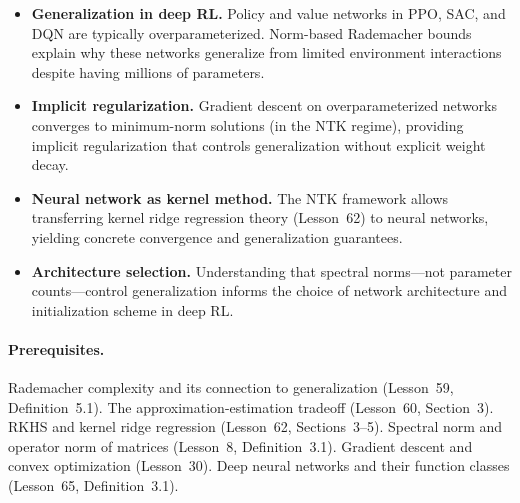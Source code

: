 \documentclass[11pt,a4paper]{article}
\begin{document}
\begin{rlconnection}[title={Why NTK and Rademacher Complexity Matter
    for RL/ML}]
\begin{itemize}[nosep]
  \item \textbf{Generalization in deep RL.}  Policy and value networks
    in PPO, SAC, and DQN are typically overparameterized.  Norm-based
    Rademacher bounds explain why these networks generalize from
    limited environment interactions despite having millions of
    parameters.
  \item \textbf{Implicit regularization.}  Gradient descent on
    overparameterized networks converges to minimum-norm solutions
    (in the NTK regime), providing implicit regularization that
    controls generalization without explicit weight decay.
  \item \textbf{Neural network as kernel method.}  The NTK framework
    allows transferring kernel ridge regression theory (Lesson~62) to
    neural networks, yielding concrete convergence and generalization
    guarantees.
  \item \textbf{Architecture selection.}  Understanding that spectral
    norms---not parameter counts---control generalization informs the
    choice of network architecture and initialization scheme in
    deep RL.
\end{itemize}
\end{rlconnection}

\paragraph{Prerequisites.}
Rademacher complexity and its connection to generalization
(Lesson~59, Definition~5.1).  The approximation-estimation tradeoff
(Lesson~60, Section~3).  RKHS and kernel ridge regression
(Lesson~62, Sections~3--5).  Spectral norm and operator norm of
matrices (Lesson~8, Definition~3.1).  Gradient descent and convex
optimization (Lesson~30).  Deep neural networks and their function
classes (Lesson~65, Definition~3.1).
\end{document}
